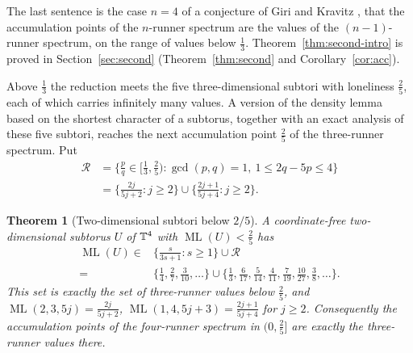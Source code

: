 \documentclass[12pt]{amsart}
\newtheorem{theorem}{Theorem}[section]
\theoremstyle{definition}\newtheorem{definition}[theorem]{Definition}
\theoremstyle{remark}\newtheorem{remark}[theorem]{Remark}
\newcommand{\ML}{\operatorname{ML}}
\begin{document}
The last sentence is the case $n=4$ of a conjecture of Giri and Kravitz \cite[Conjecture~1.5]{GiriKravitz}, that the accumulation points of the $n$-runner spectrum are the values of the $(n-1)$-runner spectrum, on the range of values below $\frac13$. Theorem~\ref{thm:second-intro} is proved in Section~\ref{sec:second} (Theorem~\ref{thm:second} and Corollary~\ref{cor:acc}).

Above $\frac13$ the reduction meets the five three-dimensional subtori with loneliness $\frac25$, each of which carries infinitely many values. A version of the density lemma based on the shortest character of a subtorus, together with an exact analysis of these five subtori, reaches the next accumulation point $\frac25$ of the three-runner spectrum. Put
\begin{align*}
 \mathcal R&=\Big\{\frac pq\in\Big[\frac13,\frac25\Big):\gcd(p,q)=1,\ 1\le 2q-5p\le4\Big\}\\
 &=\Big\{\frac{2j}{5j+2}:j\ge2\Big\}\cup\Big\{\frac{2j+1}{5j+4}:j\ge2\Big\}.
\end{align*}

\begin{theorem}[Two-dimensional subtori below $2/5$]\label{thm:upto25-intro}
A coordinate-free two-dimensional subtorus $U$ of $\mathbb T^4$ with $\ML(U)<\frac25$ has
\begin{align*}
 \ML(U)\in{}&\Big\{\frac s{3s+1}:s\ge1\Big\}\cup\mathcal R\\
 ={}&\Big\{\frac14,\frac27,\frac3{10},\dots\Big\}\cup\Big\{\frac13,\frac6{17},\frac5{14},\frac4{11},\frac7{19},\frac{10}{27},\frac38,\dots\Big\}.
\end{align*}
This set is exactly the set of three-runner values below $\frac25$, and $\ML(2,3,5j)=\frac{2j}{5j+2}$, $\ML(1,4,5j+3)=\frac{2j+1}{5j+4}$ for $j\ge2$. Consequently the accumulation points of the four-runner spectrum in $(0,\frac25]$ are exactly the three-runner values there.
\end{theorem}
\end{document}
